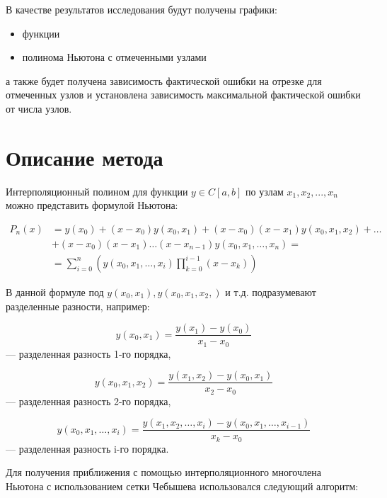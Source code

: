 \documentclass[11pt]{article}
\begin{document}
В качестве результатов исследования будут получены графики:

\begin{itemize}
    \item функции
    \item полинома Ньютона с отмеченными узлами
\end{itemize}

а также будет получена зависимость фактической ошибки на отрезке для отмеченных узлов и установлена зависимость максимальной фактической ошибки от числа узлов.

\section{Описание метода}

Интерполяционный полином для функции $y \in C[a, b]$ по узлам
$x_1, x_2, ... ,\allowbreak x_n$ можно представить формулой Ньютона:

\begin{equation}
\begin{split}
P_n(x) &= y(x_0) + (x - x_0) y(x_0, x_1) + (x - x_0)(x - x_1) y(x_0, x_1, x_2) + \dots \\
& + (x - x_0)(x - x_1) \dots (x - x_{n-1}) y(x_0, x_1, \dots, x_n) = \\
& = \sum_{i=0}^{n} (y(x_0, x_1, \dots, x_i) \prod_{k=0}^{i-1} (x - x_k))
\end{split}
\end{equation}

В данной формуле под $y(x_0,x_1), y(x_0,x_1,x_2,)$ и т.д. подразумевают разделенные разности, например:

\begin{equation}
y(x_0,x_1) = \frac{y(x_1) - y(x_0)}{x_1-x_0}
\end{equation} --- разделенная разность 1-го порядка,

\begin{equation}
y(x_0,x_1,x_2) = \frac{y(x_1,x_2) - y(x_0,x_1)}{x_2-x_0}
\end{equation} --- разделенная разность 2-го порядка,

\begin{equation}
y(x_0,x_1,\dots,x_i) = \frac{y(x_1,x_2,\dots,x_i) - y(x_0,x_1,\dots,x_{i-1})}{x_k-x_0}
\end{equation} --- разделенная разность i-го порядка.

\bigskip

Для получения приближения с помощью интерполяционного многочлена Ньютона с использованием сетки Чебышева использовался следующий алгоритм:
\end{document}
